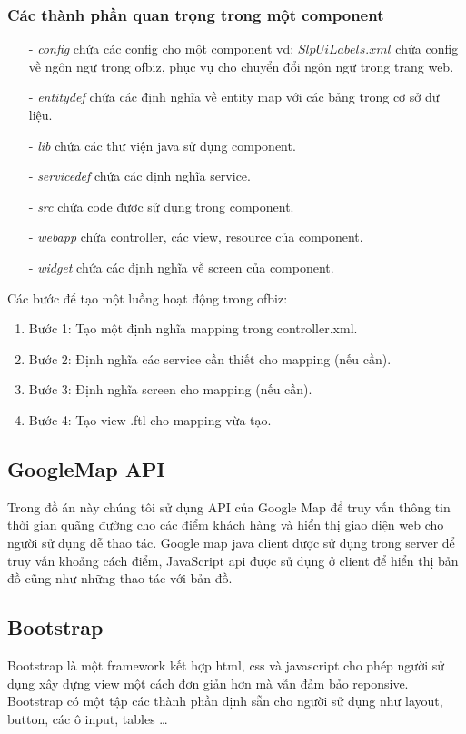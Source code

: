 \documentclass[a4paper,12pt]{report}
\begin{document}
\subsubsection{Các thành phần quan trọng trong một component}
\begin{itemize}
\item[-] \textit{config} chứa các config cho một component vd: $SlpUiLabels.xml$ chứa config về ngôn ngữ trong ofbiz, phục vụ cho chuyển đổi ngôn ngữ trong trang web.
\item[-] \textit{entitydef} chứa các định nghĩa về entity map với các bảng trong cơ sở dữ liệu.
\item[-] \textit{lib} chứa các thư viện java sử dụng component.
\item[-] \textit{servicedef} chứa các định nghĩa service.
\item[-] \textit{src} chứa code được sử dụng trong component.
\item[-] \textit{webapp} chứa controller, các view, resource của component.
\item[-] \textit{widget} chứa các định nghĩa về screen của component.
\end{itemize}
Các bước để tạo một luồng hoạt động trong ofbiz:
\begin{enumerate}
\item Bước 1: Tạo một định nghĩa mapping trong controller.xml.
\item Bước 2: Định nghĩa các service cần thiết cho mapping (nếu cần).
\item Bước 3: Định nghĩa screen cho mapping (nếu cần).
\item Bước 4: Tạo view .ftl cho mapping vừa tạo.
\end{enumerate}
\subsection{GoogleMap API}
Trong đồ án này chúng tôi sử dụng API của Google Map để truy vấn thông tin thời gian quãng đường cho các điểm khách hàng và hiển thị giao diện web cho người sử dụng dễ thao tác. Google map java client được sử dụng trong server để truy vấn khoảng cách điểm, JavaScript api được sử dụng ở client để hiển thị bản đồ cũng như những thao tác với bản đồ.
\subsection{Bootstrap}
Bootstrap là một framework kết hợp html, css và javascript cho phép người sử dụng xây dựng view một cách đơn giản hơn mà vẫn đảm bảo reponsive. Bootstrap có một tập các thành phần định sẵn cho người sử dụng như layout, button, các ô input, tables \ldots
\end{document}
